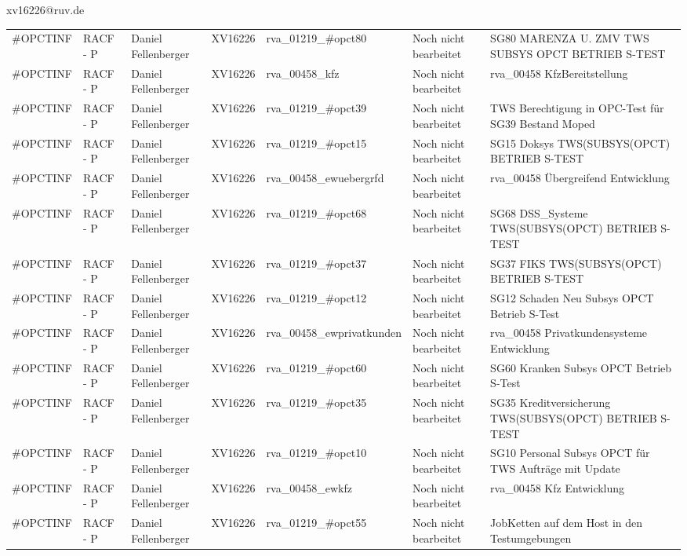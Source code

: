 \documentclass[a4paper,landscape,12pt]{letter}
\begin{document}
\begin{letter}{xv16226@ruv.de\hfill \break}
\begin{tiny}
\begin{longtable}{|p{35mm}|p{15mm}|p{25mm}|p{10mm}|p{40mm}|p{50mm}|p{50mm}|}
\#OPCTINF & RACF - P & Daniel Fellenberger & XV16226 & rva\_01219\_\#opct80 & Noch nicht bearbeitet & SG80 MARENZA U. ZMV TWS SUBSYS OPCT BETRIEB S-TEST \\
\#OPCTINF & RACF - P & Daniel Fellenberger & XV16226 & rva\_00458\_kfz & Noch nicht bearbeitet & rva\_00458 KfzBereitstellung \\
\#OPCTINF & RACF - P & Daniel Fellenberger & XV16226 & rva\_01219\_\#opct39 & Noch nicht bearbeitet & TWS Berechtigung in OPC-Test für SG39 Bestand Moped \\
\#OPCTINF & RACF - P & Daniel Fellenberger & XV16226 & rva\_01219\_\#opct15 & Noch nicht bearbeitet & SG15 Doksys TWS(SUBSYS(OPCT) BETRIEB S-TEST \\
\#OPCTINF & RACF - P & Daniel Fellenberger & XV16226 & rva\_00458\_ewuebergrfd & Noch nicht bearbeitet & rva\_00458 Übergreifend Entwicklung \\
\#OPCTINF & RACF - P & Daniel Fellenberger & XV16226 & rva\_01219\_\#opct68 & Noch nicht bearbeitet & SG68 DSS\_Systeme TWS(SUBSYS(OPCT) BETRIEB S-TEST \\
\#OPCTINF & RACF - P & Daniel Fellenberger & XV16226 & rva\_01219\_\#opct37 & Noch nicht bearbeitet & SG37 FIKS TWS(SUBSYS(OPCT) BETRIEB S-TEST \\
\#OPCTINF & RACF - P & Daniel Fellenberger & XV16226 & rva\_01219\_\#opct12 & Noch nicht bearbeitet & SG12 Schaden Neu Subsys OPCT Betrieb S-Test \\
\#OPCTINF & RACF - P & Daniel Fellenberger & XV16226 & rva\_00458\_ewprivatkunden & Noch nicht bearbeitet & rva\_00458 Privatkundensysteme Entwicklung \\
\#OPCTINF & RACF - P & Daniel Fellenberger & XV16226 & rva\_01219\_\#opct60 & Noch nicht bearbeitet & SG60 Kranken Subsys OPCT Betrieb S-Test \\
\#OPCTINF & RACF - P & Daniel Fellenberger & XV16226 & rva\_01219\_\#opct35 & Noch nicht bearbeitet & SG35 Kreditversicherung TWS(SUBSYS(OPCT) BETRIEB S-TEST \\
\#OPCTINF & RACF - P & Daniel Fellenberger & XV16226 & rva\_01219\_\#opct10 & Noch nicht bearbeitet & SG10 Personal Subsys OPCT für TWS Aufträge mit Update \\
\#OPCTINF & RACF - P & Daniel Fellenberger & XV16226 & rva\_00458\_ewkfz & Noch nicht bearbeitet & rva\_00458 Kfz Entwicklung \\
\#OPCTINF & RACF - P & Daniel Fellenberger & XV16226 & rva\_01219\_\#opct55 & Noch nicht bearbeitet & JobKetten auf dem Host in den Testumgebungen \\

\end{longtable}
\end{tiny}
\end{letter}
\end{document}
